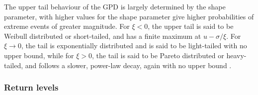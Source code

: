 \documentclass{article}
\numberwithin{equation}{section}
\begin{document}
The upper tail behaviour of the GPD is largely determined by the shape parameter, with higher values for the shape parameter give higher probabilities of extreme events of greater magnitude. 
For $\xi <0$, the upper tail is said to be Weibull distributed or short-tailed, and has a finite maximum at $u - \sigma/\xi$.
For $\xi \to 0$, the tail is exponentially distributed and is said to be light-tailed with no upper bound, while for $\xi > 0$, the tail is said to be Pareto distributed or heavy-tailed, and follows a slower, power-law decay, again with no upper bound \cite{Rohrbeck2021} \cite{Carreau2017}.

\subsubsection{Return levels}


\end{document}
